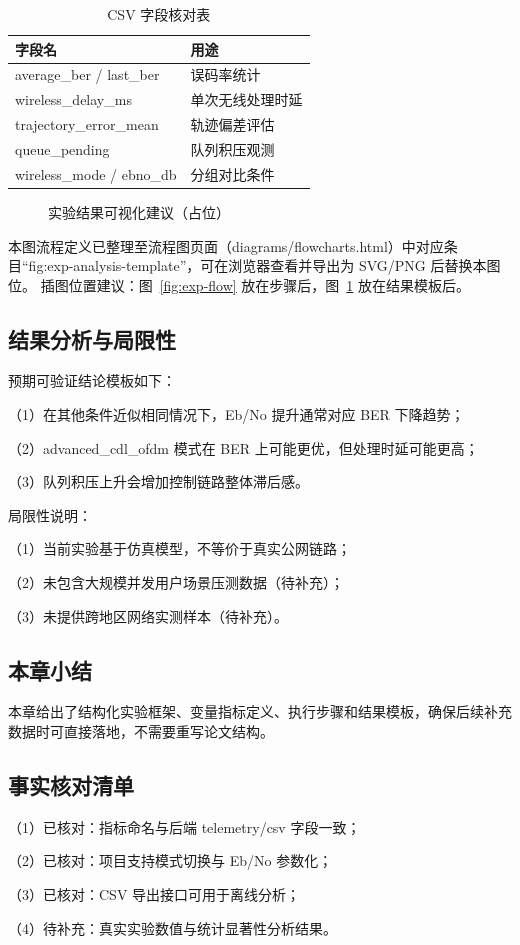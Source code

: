 \begin{table}[htbp]
\centering
\caption{CSV 字段核对表}
\label{tab:exp-csv-fields}
\begin{tabular}{ll}
\hline
字段名 & 用途 \\
\hline
average\_ber / last\_ber & 误码率统计 \\
wireless\_delay\_ms & 单次无线处理时延 \\
trajectory\_error\_mean & 轨迹偏差评估 \\
queue\_pending & 队列积压观测 \\
wireless\_mode / ebno\_db & 分组对比条件 \\
\hline
\end{tabular}
\end{table}

\begin{figure}[htbp]
\centering
{}
\caption{实验结果可视化建议（占位）}
\label{fig:exp-analysis-template}
\end{figure}

\noindent 本图流程定义已整理至流程图页面（diagrams/flowcharts.html）中对应条目“fig:exp-analysis-template”，可在浏览器查看并导出为 SVG/PNG 后替换本图位。
\noindent 插图位置建议：图~\ref{fig:exp-flow} 放在步骤后，图~\ref{fig:exp-analysis-template} 放在结果模板后。

\subsection{结果分析与局限性}
预期可验证结论模板如下：

（1）在其他条件近似相同情况下，Eb/No 提升通常对应 BER 下降趋势；

（2）advanced\_cdl\_ofdm 模式在 BER 上可能更优，但处理时延可能更高；

（3）队列积压上升会增加控制链路整体滞后感。

局限性说明：

（1）当前实验基于仿真模型，不等价于真实公网链路；

（2）未包含大规模并发用户场景压测数据（待补充）；

（3）未提供跨地区网络实测样本（待补充）。

\subsection{本章小结}
本章给出了结构化实验框架、变量指标定义、执行步骤和结果模板，确保后续补充数据时可直接落地，不需要重写论文结构。

\subsection{事实核对清单}
（1）已核对：指标命名与后端 telemetry/csv 字段一致；

（2）已核对：项目支持模式切换与 Eb/No 参数化；

（3）已核对：CSV 导出接口可用于离线分析；

（4）待补充：真实实验数值与统计显著性分析结果。
